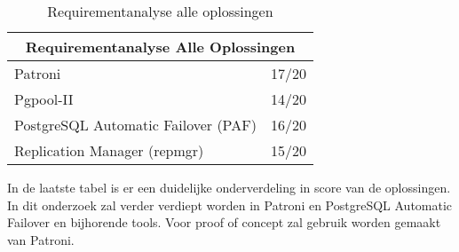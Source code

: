 \begin{table}[!h]
    \begin{tabular}{ |p{6cm}||p{6cm}|  }
        \hline
        \multicolumn{2}{|c|}{Requirementanalyse Alle Oplossingen} \\
        \hline
        Patroni & 17/20 \\
        \hline
        Pgpool-II & 14/20 \\
        \hline
        PostgreSQL Automatic Failover (PAF) & 16/20 \\
        \hline
        Replication Manager (repmgr) & 15/20 \\
        \hline
    \end{tabular}
    \caption{Requirementanalyse alle oplossingen}
    \label{table:Requirementanalyse alle oplossingen}
    In de laatste tabel is er een duidelijke onderverdeling in score van de oplossingen. In dit onderzoek zal verder verdiept worden in Patroni en PostgreSQL Automatic Failover en bijhorende tools. Voor proof of concept zal gebruik worden gemaakt van Patroni.
\end{table}


